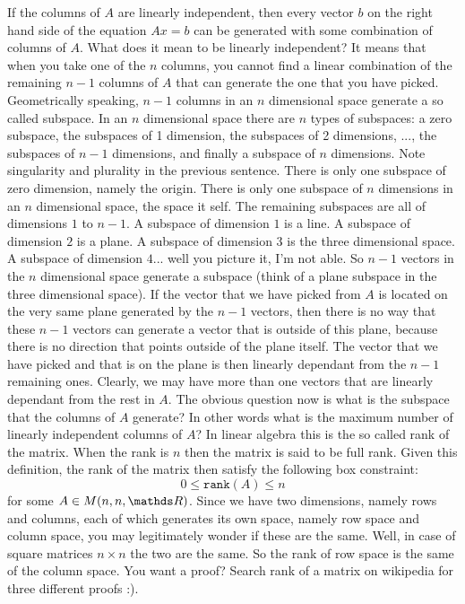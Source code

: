 \documentclass[computationalMathematics.tex]{subfiles}
\begin{document}
\par If the columns of $A$ are linearly independent, then every vector $b$ on the right hand side of the equation $A x = b$ can be generated with some combination of columns of $A$. What does it mean to be linearly independent? It means that when you take one of the $n$ columns, you cannot find a linear combination of the remaining $n-1$ columns of $A$ that can generate the one that you have picked. Geometrically speaking, $n-1$ columns in an $n$ dimensional space generate a so called subspace. In an $n$ dimensional space there are $n$ types of subspaces: a zero subspace, the subspaces of 1 dimension, the subspaces of 2 dimensions, ..., the subspaces of $n-1$ dimensions, and finally a subspace of $n$ dimensions. Note singularity and plurality in the previous sentence. There is only one subspace of zero dimension, namely the origin. There is only one subspace of $n$ dimensions in an $n$ dimensional space, the space it self. The remaining subspaces are all of dimensions $1$ to $n-1$. A subspace of dimension $1$ is a line. A subspace of dimension $2$ is a plane. A subspace of dimension $3$ is the three dimensional space. A subspace of dimension $4$... well you picture it, I'm not able. So $n-1$ vectors in the $n$ dimensional space generate a subspace (think of a plane subspace in the three dimensional space). If the vector that we have picked from $A$ is located on the very same plane generated by the $n-1$ vectors, then there is no way that these $n-1$ vectors can generate a vector that is outside of this plane, because there is no direction that points outside of the plane itself. The vector that we have picked and that is on the plane is then linearly dependant from the $n-1$ remaining ones. Clearly, we may have more than one vectors that are linearly dependant from the rest in $A$. The obvious question now is what is the subspace that the columns of $A$ generate? In other words what is the maximum number of linearly independent columns of $A$? In linear algebra this is the so called rank of the matrix. When the rank is $n$ then the matrix is said to be full rank. Given this definition, the rank of the matrix then satisfy the following box constraint:
\[
    0 \leq \texttt{rank}(A) \leq n
\]
for some $A \in M(n,n,\R)$. Since we have two dimensions, namely rows and columns, each of which generates its own space, namely row space and column space, you may legitimately wonder if these are the same. Well, in case of square matrices $n \times n$ the two are the same. So the rank of row space is the same of the column space. You want a proof? Search rank of a matrix on wikipedia for three different proofs :).
\end{document}
